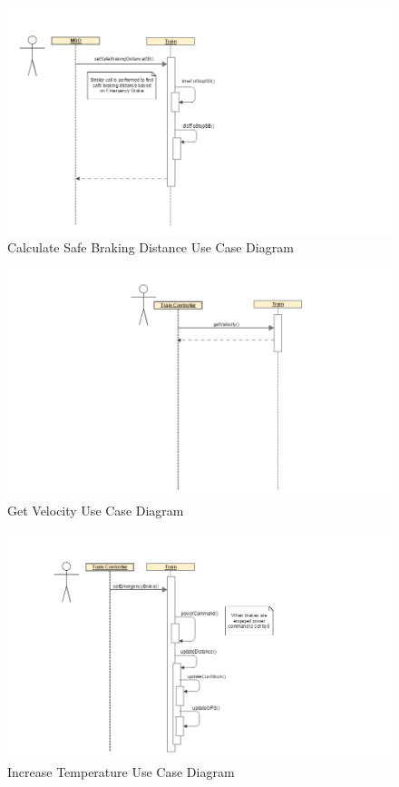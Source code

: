 \documentclass[]{article}
\begin{document}
\begin{figure}[H]
	\centering
	\includegraphics[scale=.3]{train_model_sqd_get_safebraking_dist.png}
	\caption{Calculate Safe Braking Distance Use Case Diagram}
\end{figure}

\begin{figure}[H]
	\centering
	\includegraphics[scale=.3]{train_model_sqd_get_velocity.png}
	\caption{Get Velocity Use Case Diagram}
\end{figure}

\begin{figure}[H]
	\centering
	\includegraphics[scale=.3]{train_model_sqd_increase_temp.png}
	\caption{Increase Temperature Use Case Diagram}
\end{figure}
\end{document}
